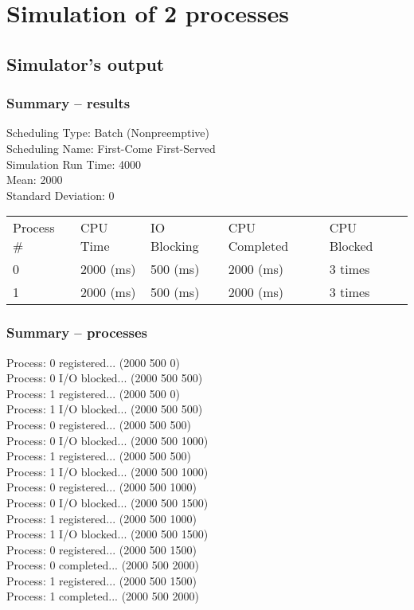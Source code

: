 \documentclass{article}
\begin{document}
\newpage

\section{Simulation of 2 processes}
\subsection{Simulator's output}
\subsubsection*{Summary -- results}
\ttfamily

Scheduling Type: Batch (Nonpreemptive)\\
Scheduling Name: First-Come First-Served\\
Simulation Run Time: 4000\\
Mean: 2000\\
Standard Deviation: 0\\
\begin{tabular}{@{}l l l l l}
    Process \# &	CPU Time &	IO Blocking &	CPU Completed &	CPU Blocked\\
    0		    &2000 (ms)	&500 (ms)	&2000 (ms)	    &3 times\\
    1		    &2000 (ms)	&500 (ms)	&2000 (ms)	    &3 times
\end{tabular}

\subsubsection*{Summary -- processes}
Process: 0 registered... (2000 500 0)\\
Process: 0 I/O blocked... (2000 500 500)\\
Process: 1 registered... (2000 500 0)\\
Process: 1 I/O blocked... (2000 500 500)\\
Process: 0 registered... (2000 500 500)\\
Process: 0 I/O blocked... (2000 500 1000)\\
Process: 1 registered... (2000 500 500)\\
Process: 1 I/O blocked... (2000 500 1000)\\
Process: 0 registered... (2000 500 1000)\\
Process: 0 I/O blocked... (2000 500 1500)\\
Process: 1 registered... (2000 500 1000)\\
Process: 1 I/O blocked... (2000 500 1500)\\
Process: 0 registered... (2000 500 1500)\\
Process: 0 completed... (2000 500 2000)\\
Process: 1 registered... (2000 500 1500)\\
Process: 1 completed... (2000 500 2000)
\end{document}
